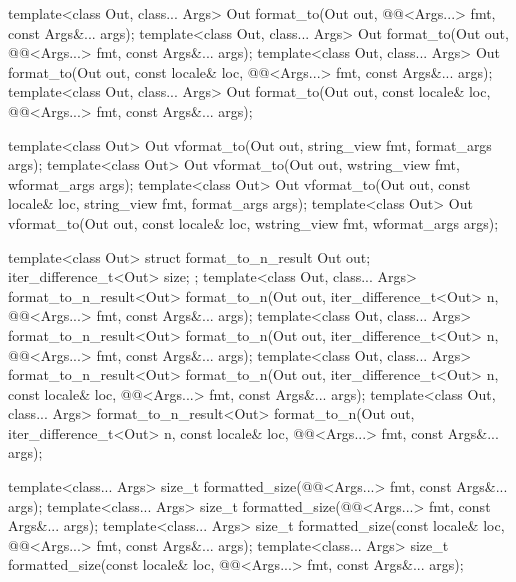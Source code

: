 \begin{codeblock}
{  template<class Out, class... Args>
    Out format_to(Out out, @@<Args...> fmt, const Args&... args);
  template<class Out, class... Args>
    Out format_to(Out out, @@<Args...> fmt, const Args&... args);
  template<class Out, class... Args>
    Out format_to(Out out, const locale& loc, @@<Args...> fmt, const Args&... args);
  template<class Out, class... Args>
    Out format_to(Out out, const locale& loc, @@<Args...> fmt, const Args&... args);

  template<class Out>
    Out vformat_to(Out out, string_view fmt, format_args args);
  template<class Out>
    Out vformat_to(Out out, wstring_view fmt, wformat_args args);
  template<class Out>
    Out vformat_to(Out out, const locale& loc, string_view fmt, format_args args);
  template<class Out>
    Out vformat_to(Out out, const locale& loc, wstring_view fmt, wformat_args args);

  template<class Out> struct format_to_n_result {
    Out out;
    iter_difference_t<Out> size;
  };
  template<class Out, class... Args>
    format_to_n_result<Out> format_to_n(Out out, iter_difference_t<Out> n,
                                        @@<Args...> fmt, const Args&... args);
  template<class Out, class... Args>
    format_to_n_result<Out> format_to_n(Out out, iter_difference_t<Out> n,
                                        @@<Args...> fmt, const Args&... args);
  template<class Out, class... Args>
    format_to_n_result<Out> format_to_n(Out out, iter_difference_t<Out> n,
                                        const locale& loc, @@<Args...> fmt,
                                        const Args&... args);
  template<class Out, class... Args>
    format_to_n_result<Out> format_to_n(Out out, iter_difference_t<Out> n,
                                        const locale& loc, @@<Args...> fmt,
                                        const Args&... args);

  template<class... Args>
    size_t formatted_size(@@<Args...> fmt, const Args&... args);
  template<class... Args>
    size_t formatted_size(@@<Args...> fmt, const Args&... args);
  template<class... Args>
    size_t formatted_size(const locale& loc, @@<Args...> fmt, const Args&... args);
  template<class... Args>
    size_t formatted_size(const locale& loc, @@<Args...> fmt, const Args&... args);

}
\end{codeblock}
